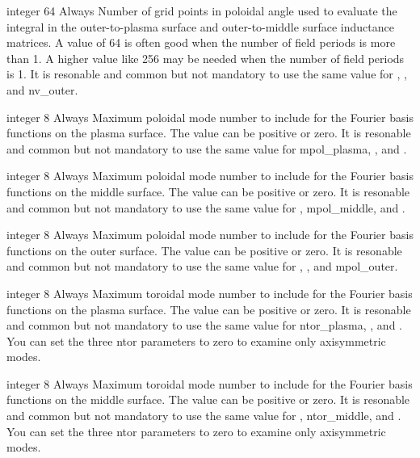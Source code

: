 \myhrule

{integer}
{64}
{Always}
{Number of grid points in poloidal angle used to evaluate the integral  in the outer-to-plasma surface and outer-to-middle surface inductance matrices.
A value of 64 is often good when the number of field periods is more than 1. A higher value like 256 may be needed when the number of field periods is 1.
It is resonable and common but not mandatory to use the same value for , , and nv\_outer.}

\myhrule

{integer}
{8}
{Always}
{Maximum poloidal mode number to include for the Fourier basis functions on the plasma surface. The value can be positive or zero.
It is resonable and common but not mandatory to use the same value for {\ttfamily mpol\_plasma}, , and .}

\myhrule

{integer}
{8}
{Always}
{Maximum poloidal mode number to include for the Fourier basis functions on the middle surface. The value can be positive or zero.
It is resonable and common but not mandatory to use the same value for , {\ttfamily mpol\_middle}, and .}

\myhrule

{integer}
{8}
{Always}
{Maximum poloidal mode number to include for the Fourier basis functions on the outer surface. The value can be positive or zero.
It is resonable and common but not mandatory to use the same value for , , and {\ttfamily mpol\_outer}.}

\myhrule

{integer}
{8}
{Always}
{Maximum toroidal mode number to include for the Fourier basis functions on the plasma surface. The value can be positive or zero.
It is resonable and common but not mandatory to use the same value for {\ttfamily ntor\_plasma}, , and .
You can set the three {\ttfamily ntor} parameters to zero to examine only axisymmetric modes.}

\myhrule

{integer}
{8}
{Always}
{Maximum toroidal mode number to include for the Fourier basis functions on the middle surface. The value can be positive or zero.
It is resonable and common but not mandatory to use the same value for , {\ttfamily ntor\_middle}, and .
You can set the three {\ttfamily ntor} parameters to zero to examine only axisymmetric modes.}

